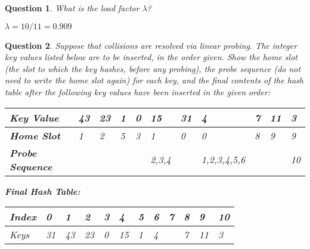 \documentclass{article}
\newtheorem{Q}{Question}
\begin{document}
\begin{Q}
	What is the load factor $\lambda$?

	$\lambda = 10/11 = 0.909$
	\vspace{2cm}
\end{Q}

\begin{Q}
	Suppose that collisions are resolved via linear probing. The integer key values listed below are to
	be inserted, in the order given. Show the home slot (the slot to which the key hashes, before any probing), the
	probe sequence (do not need to write the home slot again) for each key, and the final contents of the hash table after the following key values have been inserted in the given order:
	\begin{table}[ht]
		\begin{tabular}{|p{1.7cm}|p{1cm}|p{1cm}|p{1cm}|p{1cm}|p{1cm}|p{1cm}|p{1cm}|p{1cm}|p{1cm}|p{1cm}|}
			\hline
			\textbf{Key Value}      & 43 & 23 & 1 & 0 & 15    & 31 & 4                  & 7 & 11 & 3  \\ \hline
			\textbf{Home Slot}      & 1  & 2  & 5 & 3 & 1     & 0  & 0                  & 8 & 9  & 9  \\ \hline
			\textbf{Probe Sequence} &    &    &   &   & 2,3,4 &    & \tiny{1,2,3,4,5,6} &   &    & 10 \\ \hline
		\end{tabular}
	\end{table}
	\pagebreak

	\textbf{Final Hash Table:}
	\begin{table}[ht]
		\begin{tabular}{|l|p{1cm}|p{1cm}|p{1cm}|p{1cm}|p{1cm}|p{1cm}|p{1cm}|p{1cm}|p{1cm}|p{1cm}|p{1cm}|}
			\hline
			Index & 0  & 1  & 2  & 3 & 4  & 5 & 6 & 7 & 8 & 9  & 10 \\ \hline
			Keys  & 31 & 43 & 23 & 0 & 15 & 1 & 4 &   & 7 & 11 & 3  \\ \hline
		\end{tabular}
	\end{table}
\end{Q}
\end{document}
